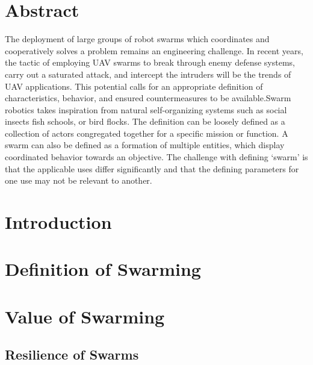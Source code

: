 \section*{Abstract}
The deployment of large groups of robot swarms which coordinates and cooperatively solves a problem remains an engineering challenge. In recent years, the tactic of employing UAV swarms to break through enemy defense systems, carry out a saturated attack, and intercept the intruders will be the trends of UAV applications. This potential calls for an appropriate definition of characteristics, behavior, and ensured countermeasures to be available.Swarm robotics takes inspiration from natural self-organizing systems such as social insects fish schools, or bird flocks. The definition can be loosely defined as a collection of actors congregated together for a specific mission or function. A swarm can also be defined as a formation of multiple entities, which display coordinated behavior towards an objective. The challenge with defining ‘swarm’ is that the applicable uses differ significantly and that the defining parameters for one use may not be relevant to another. 


\section*{Introduction}

\section*{Definition of Swarming}

\section*{Value of Swarming}
\subsection*{Resilience of Swarms}